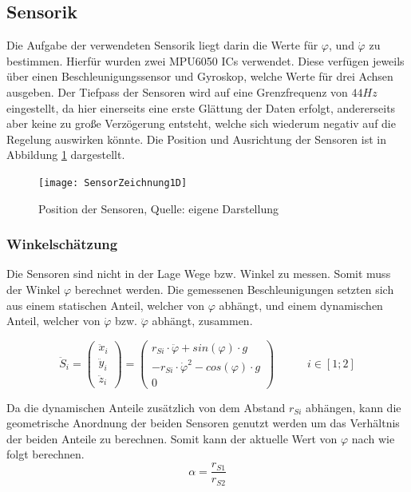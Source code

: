 \subsection{Sensorik}
\label{Sensorik_sec}
Die Aufgabe der verwendeten Sensorik liegt darin die Werte für $\varphi$, und $\dot{\varphi}$ zu bestimmen. Hierfür wurden zwei MPU6050 ICs verwendet. Diese verfügen jeweils über einen Beschleunigungssensor und Gyroskop, welche Werte für drei Achsen ausgeben. Der Tiefpass der Sensoren wird auf eine Grenzfrequenz von $44Hz$ eingestellt, da hier einerseits eine erste Glättung der Daten erfolgt, andererseits aber keine zu große Verzögerung entsteht, welche sich wiederum negativ auf die Regelung auswirken könnte. Die Position und Ausrichtung der Sensoren ist in Abbildung \ref{Position_Sensoren_pic} dargestellt.

\begin{figure}[h]
\texttt{[image: SensorZeichnung1D]}
\caption{Position der Sensoren, Quelle: eigene Darstellung}

\label{Position_Sensoren_pic}
\end{figure}

\subsubsection{Winkelschätzung}
Die Sensoren sind nicht in der Lage Wege bzw. Winkel zu messen. Somit muss der Winkel $\varphi$ berechnet werden. Die gemessenen Beschleunigungen setzten sich aus einem statischen Anteil, welcher von $\varphi$ abhängt, und einem dynamischen Anteil, welcher von $\dot{\varphi}$ bzw. $\ddot{\varphi}$ abhängt, zusammen.

\begin{equation}
\ddot{S}_i = 
\begin{pmatrix}
\ddot{x}_i \\ \ddot{y}_i \\ \ddot{z}_i
\end{pmatrix} =
\begin{pmatrix}
r_{Si} \cdot \ddot{\varphi} + sin(\varphi) \cdot g \\
- r_{Si} \cdot \dot{\varphi}^2 - cos(\varphi) \cdot g \\
0
\end{pmatrix}
\hspace{35pt}
i \in [1;2]
\end{equation}

Da die dynamischen Anteile zusätzlich von dem Abstand $r_{Si}$ abhängen, kann die geometrische Anordnung der beiden Sensoren genutzt werden um das Verhältnis der beiden Anteile zu berechnen. Somit kann der aktuelle Wert von $\varphi$ nach \cite{Cubli1D} wie folgt berechnen.
\begin{equation}
\alpha = \frac{r_{S1}}{r_{S2}}
\end{equation}

